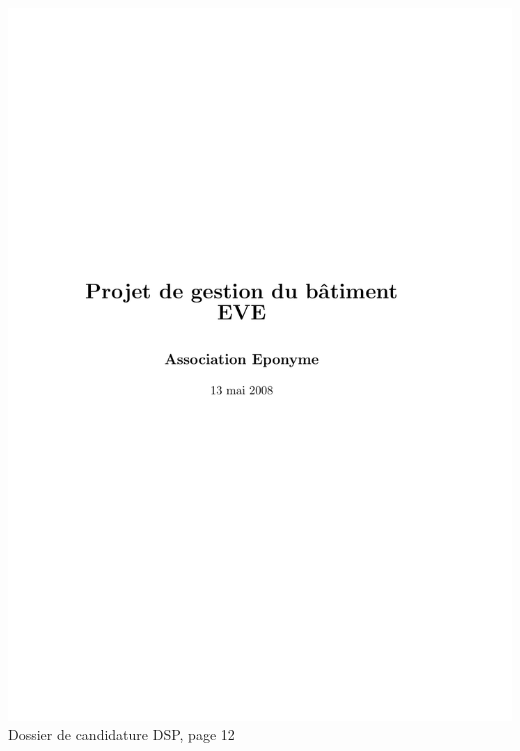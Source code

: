 \includegraphics[scale=0.85,trim=20mm 20mm 20mm 20mm,clip,page=12]{annexes/candidature_dsp.pdf} \\
Dossier de candidature DSP, page 12
\newpage
